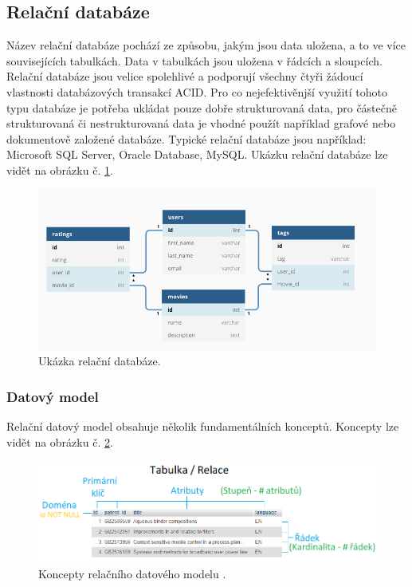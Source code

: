 \subsection{Relační databáze}
Název relační databáze pochází ze způsobu, jakým jsou data uložena, a to ve více souvisejících tabulkách. Data v tabulkách jsou uložena v řádcích a sloupcích. Relační databáze jsou velice spolehlivé a podporují všechny čtyři žádoucí vlastnosti databázových transakcí \gls{ACID}. Pro co nejefektivěnjší využití tohoto typu databáze je potřeba ukládat pouze dobře strukturovaná data, pro částečně strukturovaná či nestrukturovaná data je vhodné použít například grafové nebo dokumentově založené databáze. Typické relační databáze jsou například: Microsoft SQL Server, Oracle Database, MySQL. Ukázku relační databáze lze vidět na obrázku č. \ref{fig:db_img_relational}.
	\begin{figure}[H]
	\centering
	\includegraphics[width=14cm]{img/databaze/relational_db}
	\caption{Ukázka relační databáze.}
	\label{fig:db_img_relational}
	\end{figure}
\newpage
\subsubsection{Datový model}
Relační datový model obsahuje několik fundamentálních konceptů. Koncepty lze vidět na obrázku č. \ref{fig:model_relational}.
\begin{figure}[H]
\centering
\includegraphics[width=16cm]{img/databaze/data_model_relational}
\caption{Koncepty relačního datového modelu \cite{data_model_oo}.}
\label{fig:model_relational}
\end{figure}

